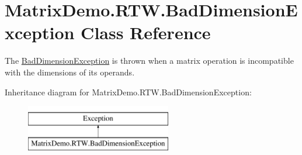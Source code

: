 \hypertarget{class_matrix_demo_1_1_r_t_w_1_1_bad_dimension_exception}{}\section{Matrix\+Demo.\+R\+T\+W.\+Bad\+Dimension\+Exception Class Reference}
\label{class_matrix_demo_1_1_r_t_w_1_1_bad_dimension_exception}


The \mbox{\hyperlink{class_matrix_demo_1_1_r_t_w_1_1_bad_dimension_exception}{Bad\+Dimension\+Exception}} is thrown when a matrix operation is incompatible with the dimensions of its operands.  


Inheritance diagram for Matrix\+Demo.\+R\+T\+W.\+Bad\+Dimension\+Exception\+:\begin{figure}[H]
\begin{center}
\leavevmode
\includegraphics[height=2.000000cm]{class_matrix_demo_1_1_r_t_w_1_1_bad_dimension_exception}
\end{center}
\end{figure}

